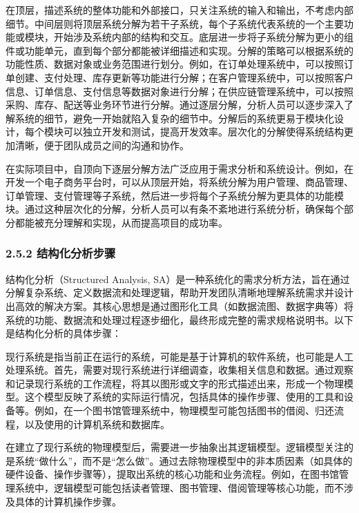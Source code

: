 在顶层，描述系统的整体功能和外部接口，只关注系统的输入和输出，不考虑内部细节。中间层则将顶层系统分解为若干子系统，每个子系统代表系统的一个主要功能或模块，开始涉及系统内部的结构和交互。底层进一步将子系统分解为更小的组件或功能单元，直到每个部分都能被详细描述和实现。分解的策略可以根据系统的功能性质、数据对象或业务范围进行划分。例如，在订单处理系统中，可以按照订单创建、支付处理、库存更新等功能进行分解；在客户管理系统中，可以按照客户信息、订单信息、支付信息等数据对象进行分解；在供应链管理系统中，可以按照采购、库存、配送等业务环节进行分解。通过逐层分解，分析人员可以逐步深入了解系统的细节，避免一开始就陷入复杂的细节中。分解后的系统更易于模块化设计，每个模块可以独立开发和测试，提高开发效率。层次化的分解使得系统结构更加清晰，便于团队成员之间的沟通和协作。

在实际项目中，自顶向下逐层分解方法广泛应用于需求分析和系统设计。例如，在开发一个电子商务平台时，可以从顶层开始，将系统分解为用户管理、商品管理、订单管理、支付管理等子系统，然后进一步将每个子系统分解为更具体的功能模块。通过这种层次化的分解，分析人员可以有条不紊地进行系统分析，确保每个部分都能被充分理解和实现，从而提高项目的成功率。

\hypertarget{ux7ed3ux6784ux5316ux5206ux6790ux6b65ux9aa4}{%
\subsubsection{2.5.2 结构化分析步骤}\label{ux7ed3ux6784ux5316ux5206ux6790ux6b65ux9aa4}}

结构化分析（Structured Analysis, SA）是一种系统化的需求分析方法，旨在通过分解复杂系统、定义数据流和处理逻辑，帮助开发团队清晰地理解系统需求并设计出高效的解决方案。其核心思想是通过图形化工具（如数据流图、数据字典等）将系统的功能、数据流和处理过程逐步细化，最终形成完整的需求规格说明书。以下是结构化分析的具体步骤：


现行系统是指当前正在运行的系统，可能是基于计算机的软件系统，也可能是人工处理系统。首先，需要对现行系统进行详细调查，收集相关信息和数据。通过观察和记录现行系统的工作流程，将其以图形或文字的形式描述出来，形成一个物理模型。这个模型反映了系统的实际运行情况，包括具体的操作步骤、使用的工具和设备等。例如，在一个图书馆管理系统中，物理模型可能包括图书的借阅、归还流程，以及使用的计算机系统和数据库。


在建立了现行系统的物理模型后，需要进一步抽象出其逻辑模型。逻辑模型关注的是系统``做什么''，而不是``怎么做''。通过去除物理模型中的非本质因素（如具体的硬件设备、操作步骤等），提取出系统的核心功能和业务流程。例如，在图书馆管理系统中，逻辑模型可能包括读者管理、图书管理、借阅管理等核心功能，而不涉及具体的计算机操作步骤。

